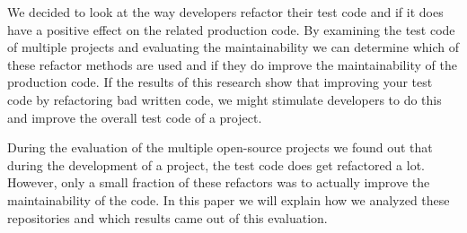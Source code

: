 We decided to look at the way developers refactor their test code and if it does have a positive effect on the related production code. By examining the test code of multiple projects and evaluating the maintainability we can determine which of these refactor methods are used and if they do improve the maintainability of the production code. If the results of this research show that improving your test code by refactoring bad written code, we might stimulate developers to do this and improve the overall test code of a project.

During the evaluation of the multiple open-source projects we found out that during the development of a project, the test code does get refactored a lot. However, only a small fraction of these refactors was to actually improve the maintainability of the code. In this paper we will explain how we analyzed these repositories and which results came out of this evaluation.
\newpage